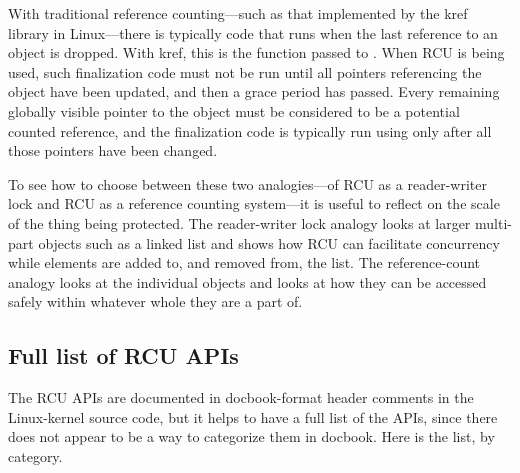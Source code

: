 With traditional reference counting---such as that implemented by the
kref library in Linux---there is typically code that runs when the last
reference to an object is dropped.
With kref, this is the function
passed to .
When RCU is being used, such finalization code
must not be run until all  pointers referencing the object have
been updated, and then a grace period has passed.
Every remaining
globally visible pointer to the object must be considered to be a
potential counted reference, and the finalization code is typically run
using  only after all those pointers have been changed.

To see how to choose between these two analogies---of RCU as a
reader-writer lock and RCU as a reference counting system---it is useful
to reflect on the scale of the thing being protected.
The reader-writer
lock analogy looks at larger multi-part objects such as a linked list
and shows how RCU can facilitate concurrency while elements are added
to, and removed from, the list.
The reference-count analogy looks at
the individual objects and looks at how they can be accessed safely
within whatever whole they are a part of.


\subsection{Full list of RCU APIs}
\label{sec:rcu:Full list of RCU APIs}

The RCU APIs are documented in docbook-format header comments in the
Linux-kernel source code, but it helps to have a full list of the
APIs, since there does not appear to be a way to categorize them
in docbook.  Here is the list, by category.


